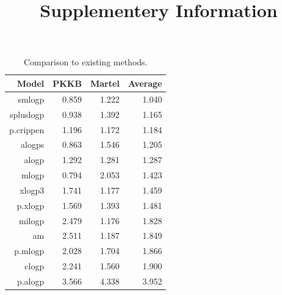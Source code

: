 \documentclass[]{article}
\begin{document}
\title{Supplementery Information}
\maketitle

\begin{table}[htbp]
  \centering
  \caption{Comparison to existing methods.}
    \begin{tabular}{rrrr}
    \toprule
    Model & PKKB  & Martel & Average \\
    \midrule
    smlogp & 0.859 & 1.222 & 1.040 \\
    spluslogp & 0.938 & 1.392 & 1.165 \\
    p.crippen & 1.196 & 1.172 & 1.184 \\
    alogps & 0.863 & 1.546 & 1.205 \\
    alogp & 1.292 & 1.281 & 1.287 \\
    mlogp & 0.794 & 2.053 & 1.423 \\
    xlogp3 & 1.741 & 1.177 & 1.459 \\
    p.xlogp & 1.569 & 1.393 & 1.481 \\
    milogp & 2.479 & 1.176 & 1.828 \\
    am    & 2.511 & 1.187 & 1.849 \\
    p.mlogp & 2.028 & 1.704 & 1.866 \\
    clogp & 2.241 & 1.560 & 1.900 \\
    p.alogp & 3.566 & 4.338 & 3.952 \\
    \bottomrule
    \end{tabular}%
  \label{tab:external_comparison}%
\end{table}%
\end{document}
